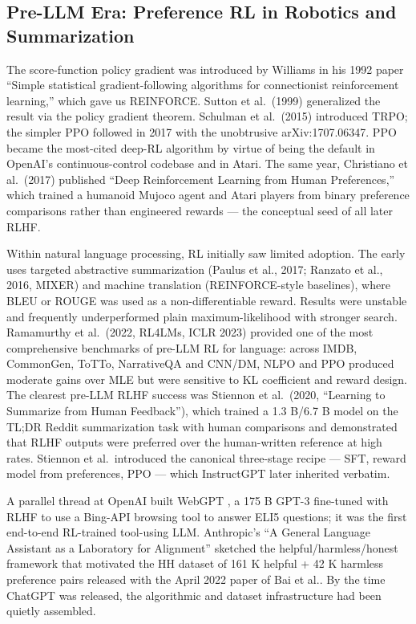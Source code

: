 \documentclass{article}
\begin{document}
\subsection{Pre-LLM Era: Preference RL in Robotics and Summarization}\label{pre-llm-era-preference-rl-in-robotics-and-summarization}

The score-function policy gradient was introduced by Williams in his 1992 paper ``Simple statistical gradient-following algorithms for connectionist reinforcement learning,'' which gave us REINFORCE. Sutton et al.~(1999) generalized the result via the policy gradient theorem. Schulman et al.~(2015) introduced TRPO; the simpler PPO followed in 2017 with the unobtrusive arXiv:1707.06347. PPO became the most-cited deep-RL algorithm by virtue of being the default in OpenAI's continuous-control codebase and in Atari. The same year, Christiano et al.~(2017) published ``Deep Reinforcement Learning from Human Preferences,'' which trained a humanoid Mujoco agent and Atari players from binary preference comparisons rather than engineered rewards --- the conceptual seed of all later RLHF.

Within natural language processing, RL initially saw limited adoption. The early uses targeted abstractive summarization (Paulus et al., 2017; Ranzato et al., 2016, MIXER) and machine translation (REINFORCE-style baselines), where BLEU or ROUGE was used as a non-differentiable reward. Results were unstable and frequently underperformed plain maximum-likelihood with stronger search. Ramamurthy et al.~(2022, RL4LMs, ICLR 2023) provided one of the most comprehensive benchmarks of pre-LLM RL for language: across IMDB, CommonGen, ToTTo, NarrativeQA and CNN/DM, NLPO and PPO produced moderate gains over MLE but were sensitive to KL coefficient and reward design. The clearest pre-LLM RLHF success was Stiennon et al.~(2020, ``Learning to Summarize from Human Feedback''), which trained a 1.3 B/6.7 B model on the TL;DR Reddit summarization task with human comparisons and demonstrated that RLHF outputs were preferred over the human-written reference at high rates. Stiennon et al.~introduced the canonical three-stage recipe --- SFT, reward model from preferences, PPO --- which InstructGPT later inherited verbatim.

A parallel thread at OpenAI built WebGPT \citep{nakano20212021}, a 175 B GPT-3 fine-tuned with RLHF to use a Bing-API browsing tool to answer ELI5 questions; it was the first end-to-end RL-trained tool-using LLM. Anthropic's ``A General Language Assistant as a Laboratory for Alignment'' \citep{askell20212021} sketched the helpful/harmless/honest framework that motivated the HH dataset of 161 K helpful + 42 K harmless preference pairs released with the April 2022 paper of Bai et al.. By the time ChatGPT was released, the algorithmic and dataset infrastructure had been quietly assembled.
\end{document}
